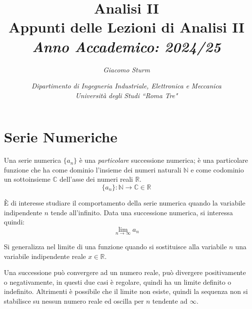 \documentclass{article}
\numberwithin{equation}{subsection}
\begin{document}
\title{%
    \textbf{Analisi II}  \\ 
    \large Appunti delle Lezioni di Analisi II \\
    \textit{Anno Accademico: 2024/25}}
\author{\textit{Giacomo Sturm}}
\date{\textit{Dipartimento di Ingegneria Industriale, Elettronica e Meccanica \\
Università degli Studi ``Roma Tre"}} 

\maketitle
\thispagestyle{link}

\clearpage


\pagestyle{fancy}
\fancyhead{}\fancyfoot{}
\fancyfoot[C]{\thepage}

\tableofcontents


\clearpage
{}

\section{Serie Numeriche}

Una serie numerica $\{a_n\}$ è una \textit{particolare} successione numerica; 
è una particolare funzione che ha come dominio l'insieme dei numeri naturali $\mathbb{N}$ e come codominio un sottoinsieme $\mathbb{C}$ dell'asse dei numeri reali $\mathbb{R}$. 
\begin{equation}
    \{a_n\}:\mathbb{N}\rightarrow\mathbb{C}\in\mathbb{R}
\end{equation}

È di interesse studiare il comportamento della serie numerica quando la variabile indipendente $n$ tende all'infinito. Data una successione numerica, si interessa quindi:
\begin{equation}
    \lim_{n\to\infty}a_n
\end{equation}

Si generalizza nel limite di una funzione quando si sostituisce alla variabile $n$ una variabile indipendente reale $x\in\mathbb{R}$. 

Una successione può convergere ad un numero reale, può divergere positivamente o negativamente, in questi due casi è regolare, quindi ha un limite definito o indefinito. Altrimenti è possibile che il limite non esiste, quindi la sequenza non si stabilisce su nessun numero reale ed oscilla per $n$ tendente ad $\infty$. 
\end{document}

